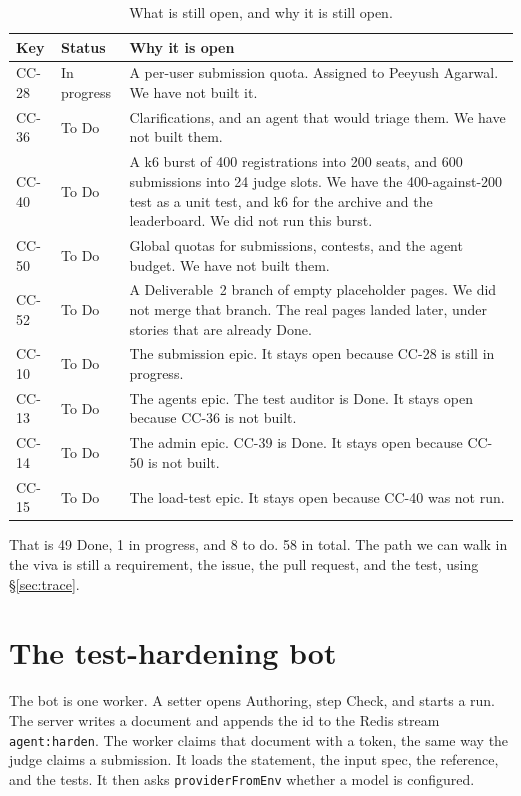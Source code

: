 \documentclass[11pt,a4paper]{article}
\begin{document}
\begin{table}[ht]
\centering
\caption{What is still open, and why it is still open.}
\label{tab:open}
{\small
\begin{tabularx}{\textwidth}{@{}l l Y@{}}
\toprule
Key & Status & Why it is open \\
\midrule
CC-28 & In progress &
A per-user submission quota. Assigned to Peeyush Agarwal. We have not built it. \\
CC-36 & To Do &
Clarifications, and an agent that would triage them. We have not built them. \\
CC-40 & To Do &
A k6 burst of 400 registrations into 200 seats, and 600 submissions into 24 judge slots. We have the 400-against-200 test as a unit test, and k6 for the archive and the leaderboard. We did not run this burst. \\
CC-50 & To Do &
Global quotas for submissions, contests, and the agent budget. We have not built them. \\
CC-52 & To Do &
A Deliverable~2 branch of empty placeholder pages. We did not merge that branch. The real pages landed later, under stories that are already Done. \\
CC-10 & To Do &
The submission epic. It stays open because CC-28 is still in progress. \\
CC-13 & To Do &
The agents epic. The test auditor is Done. It stays open because CC-36 is not built. \\
CC-14 & To Do &
The admin epic. CC-39 is Done. It stays open because CC-50 is not built. \\
CC-15 & To Do &
The load-test epic. It stays open because CC-40 was not run. \\
\bottomrule
\end{tabularx}
}
\end{table}

That is 49 Done, 1 in progress, and 8 to do. 58 in total. The path we can walk in the viva is still a requirement, the issue, the pull request, and the test, using \S\ref{sec:trace}.

\section{The test-hardening bot}
\label{sec:bot}

The bot is one worker. A setter opens Authoring, step Check, and starts a run. The server writes a document and appends the id to the Redis stream \texttt{agent:harden}. The worker claims that document with a token, the same way the judge claims a submission. It loads the statement, the input spec, the reference, and the tests. It then asks \texttt{providerFromEnv} whether a model is configured.
\end{document}
